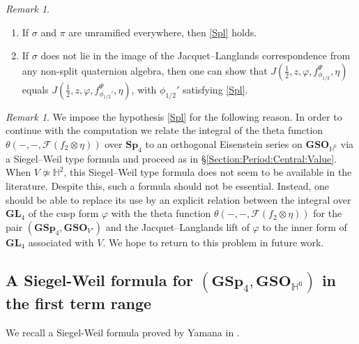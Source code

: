 \documentclass[11pt, reqno]{amsart}
\theoremstyle{plain}
\theoremstyle{definition}
\theoremstyle{remark}
\newtheorem{remark}[theorem]{Remark}
\theoremstyle{plain}
\def\GSp{{\mathbf{GSp}}}
\def\Sp{{\mathbf{Sp}}}
\def\GSO{{\mathbf{GSO}}}
\def\GL{\mathbf{GL}}
\begin{document}
\begin{remark}\leavevmode
    \begin{enumerate}
    \item If $\sigma$ and $\pi$ are unramified everywhere, then \eqref{Spl} holds.
    \item If $\sigma$ does not lie in the image of the Jacquet--Langlands correspondence from any non-split quaternion algebra, then one can show that $J(\tfrac{1}{2},z,\varphi,f^\Psi_{\phi_{1/2}}, \eta)$ equals $J(\tfrac{1}{2},z,\varphi,f^\Psi_{\phi_{1/2}'}, \eta)$, with $\phi_{1/2}'$ satisfying \eqref{Spl}.
        \end{enumerate}
        \end{remark}
\begin{remark}\label{remark_on_spl} We impose the hypothesis \eqref{Spl} for the following reason. In order to continue with the computation we relate the integral of the theta function $\theta(-, -, \mathcal{F}(f_2\otimes \eta))$ over $\Sp_4$ to an orthogonal Eisenstein series on $\GSO_{\mathbb{H}^6}$ via a Siegel--Weil type formula and proceed as in \S \ref{Section:Period:Central:Value}. 
When $V\not\simeq \mathbb{H}^2$, this Siegel--Weil type formula does not seem to be available in the literature. Despite this, such a formula should not be essential. Instead, one should be able to replace its use by an explicit relation between the integral over $\GL_4$ of the cusp form $\varphi$ with the theta function $\theta(-, -, \mathcal{F}(f_2\otimes \eta))$ for the pair $(\GSp_4,\GSO_{V'})$ and the Jacquet--Langlands lift of $\varphi$ to the inner form of $\GL_4$ associated with $V$. We hope to return to this problem in future work. 
\end{remark}


\subsection{A Siegel-Weil formula for $(\GSp_4, \GSO_{\mathbb{H}^6})$ in the first term range}

We recall a Siegel-Weil formula proved by Yamana in \cite[Theorem 2.2 (i)]{YamanaSingular}. 
\end{document}
